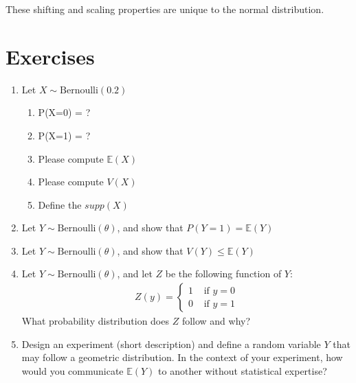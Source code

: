 These shifting and scaling properties are unique to the normal distribution.



\section{Exercises}

\begin{enumerate}
    \item Let $X \sim \text{Bernoulli}(0.2)$
    \begin{enumerate}
        \item P(X=0) = ?
        \item P(X=1) = ?
        \item Please compute $\mathbb{E}(X)$
        \item Please compute $V(X)$
        \item Define the $supp(X)$
    \end{enumerate}
    
    \item Let $Y \sim \text{Bernoulli}(\theta)$, and 
    show that $P(Y=1) = \mathbb{E}(Y)$

    \item Let $Y \sim \text{Bernoulli}(\theta)$, and 
    show that $V(Y) \leq \mathbb{E}(Y)$
    
    \item Let $Y \sim \text{Bernoulli}(\theta)$, and let $Z$ be the following function of $Y$:
    \begin{align}
        Z(y) = \begin{cases}
                1 & \text{ if } y = 0\\
                0 & \text{ if } y = 1
            \end{cases}
    \end{align}
    What probability distribution does $Z$ follow and why?
    
    \item Design an experiment (short description) and define a random variable $Y$ that may follow a geometric distribution. In the context of your experiment, how would you communicate $\mathbb{E}(Y)$ to another without statistical expertise?
    

\end{enumerate}
